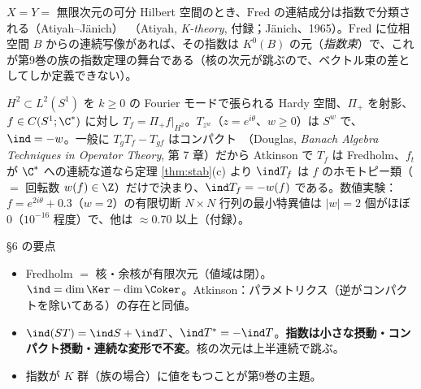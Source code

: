 \begin{center}
\end{center}
\begin{rem}
$X=Y=$ 無限次元の可分 Hilbert 空間のとき、$\mathrm{Fred}$ の連結成分は指数で分類される（Atiyah--Jänich）\tC\ （Atiyah, \emph{K-theory}, 付録；Jänich、1965）。$\mathrm{Fred}$ に位相空間 $B$ からの連続写像があれば、その指数は $K^0(B)$ の元（\emph{指数束}）で、これが第9巻の族の指数定理の舞台である（核の次元が跳ぶので、ベクトル束の差としてしか定義できない）。
\end{rem}
\begin{ex}[Toeplitz 作用素と指数 $=-$ 回転数]\label{ex:toeplitz}
$H^2\subset L^2(S^1)$ を $k\ge0$ の Fourier モードで張られる Hardy 空間、$\Pi_+$ を射影、$f\in C(S^1;\C^*)$ に対し $T_f=\Pi_+f|_{H^2}$。$T_{z^w}$（$z=e^{i\theta}$、$w\ge0$）は $S^w$ で、$\ind=-w$。一般に $T_gT_f-T_{gf}$ はコンパクト\tC\ （Douglas, \emph{Banach Algebra Techniques in Operator Theory}, 第 7 章）だから Atkinson で $T_f$ は Fredholm、$f_t$ が $\C^*$ への連続な道なら定理 \ref{thm:stab}(c) より $\ind T_f$ は $f$ のホモトピー類（$=$ 回転数 $w(f)\in\Z$）だけで決まり、$\ind T_f=-w(f)$ である\tC。数値実験：$f=e^{2i\theta}+0.3$（$w=2$）の有限切断 $N\times N$ 行列の最小特異値は $|w|=2$ 個がほぼ $0$（$10^{-16}$ 程度）で、他は $\approx0.70$ 以上（付録）。
\end{ex}
\begin{keybox}{§6 の要点}
\begin{itemize}
\item Fredholm $=$ 核・余核が有限次元（値域は閉）。$\ind=\dim\Ker-\dim\Coker$。Atkinson：パラメトリクス（逆がコンパクトを除いてある）の存在と同値。
\item $\ind(ST)=\ind S+\ind T$、$\ind T^*=-\ind T$。\textbf{指数は小さな摂動・コンパクト摂動・連続な変形で不変}。核の次元は上半連続で跳ぶ。
\item 指数が $K$ 群（族の場合）に値をもつことが第9巻の主題。
\end{itemize}
\end{keybox}
